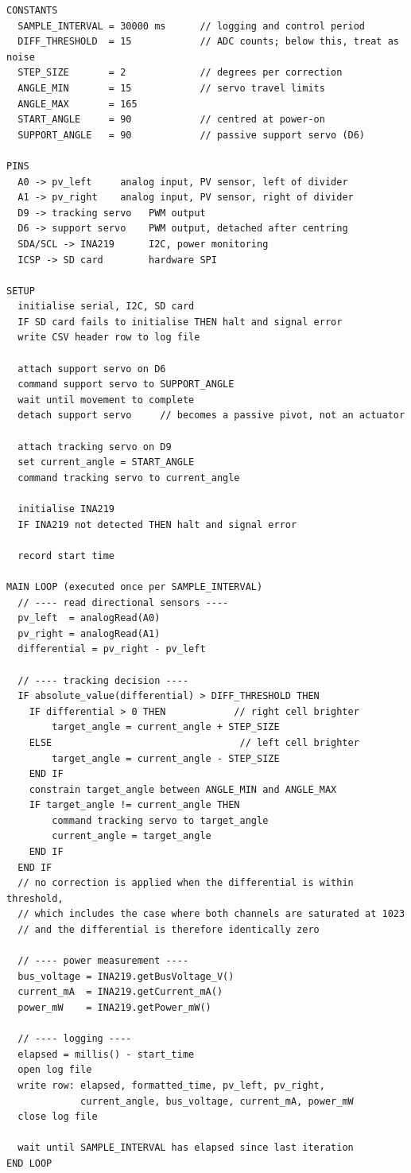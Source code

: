 \documentclass[journal]{IEEEtran}
\begin{document}
\begin{lstlisting}
CONSTANTS
  SAMPLE_INTERVAL = 30000 ms      // logging and control period
  DIFF_THRESHOLD  = 15            // ADC counts; below this, treat as noise
  STEP_SIZE       = 2             // degrees per correction
  ANGLE_MIN       = 15            // servo travel limits
  ANGLE_MAX       = 165
  START_ANGLE     = 90            // centred at power-on
  SUPPORT_ANGLE   = 90            // passive support servo (D6)

PINS
  A0 -> pv_left     analog input, PV sensor, left of divider
  A1 -> pv_right    analog input, PV sensor, right of divider
  D9 -> tracking servo   PWM output
  D6 -> support servo    PWM output, detached after centring
  SDA/SCL -> INA219      I2C, power monitoring
  ICSP -> SD card        hardware SPI

SETUP
  initialise serial, I2C, SD card
  IF SD card fails to initialise THEN halt and signal error
  write CSV header row to log file

  attach support servo on D6
  command support servo to SUPPORT_ANGLE
  wait until movement to complete
  detach support servo     // becomes a passive pivot, not an actuator

  attach tracking servo on D9
  set current_angle = START_ANGLE
  command tracking servo to current_angle

  initialise INA219
  IF INA219 not detected THEN halt and signal error

  record start time

MAIN LOOP (executed once per SAMPLE_INTERVAL)
  // ---- read directional sensors ----
  pv_left  = analogRead(A0)
  pv_right = analogRead(A1)
  differential = pv_right - pv_left

  // ---- tracking decision ----
  IF absolute_value(differential) > DIFF_THRESHOLD THEN
    IF differential > 0 THEN            // right cell brighter
        target_angle = current_angle + STEP_SIZE
    ELSE                                 // left cell brighter
        target_angle = current_angle - STEP_SIZE
    END IF
    constrain target_angle between ANGLE_MIN and ANGLE_MAX
    IF target_angle != current_angle THEN
        command tracking servo to target_angle
        current_angle = target_angle
    END IF
  END IF
  // no correction is applied when the differential is within threshold,
  // which includes the case where both channels are saturated at 1023
  // and the differential is therefore identically zero

  // ---- power measurement ----
  bus_voltage = INA219.getBusVoltage_V()
  current_mA  = INA219.getCurrent_mA()
  power_mW    = INA219.getPower_mW()

  // ---- logging ----
  elapsed = millis() - start_time
  open log file
  write row: elapsed, formatted_time, pv_left, pv_right,
             current_angle, bus_voltage, current_mA, power_mW
  close log file

  wait until SAMPLE_INTERVAL has elapsed since last iteration
END LOOP
\end{lstlisting}
\end{document}
